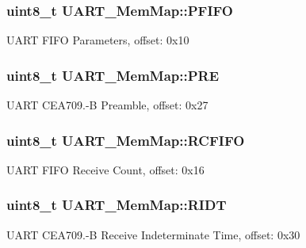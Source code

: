 \subsubsection[{P\+F\+I\+F\+O}]{\setlength{\rightskip}{0pt plus 5cm}uint8\+\_\+t U\+A\+R\+T\+\_\+\+Mem\+Map\+::\+P\+F\+I\+F\+O}\label{struct_u_a_r_t___mem_map_a6ad16328066eeb949b4ee3d4a67776be}
U\+A\+R\+T F\+I\+F\+O Parameters, offset\+: 0x10 \hypertarget{struct_u_a_r_t___mem_map_ae81ff2b0a74594984022da3767a66b20}{}
\subsubsection[{P\+R\+E}]{\setlength{\rightskip}{0pt plus 5cm}uint8\+\_\+t U\+A\+R\+T\+\_\+\+Mem\+Map\+::\+P\+R\+E}\label{struct_u_a_r_t___mem_map_ae81ff2b0a74594984022da3767a66b20}
U\+A\+R\+T C\+E\+A709.-\/\+B Preamble, offset\+: 0x27 \hypertarget{struct_u_a_r_t___mem_map_a3aab8170680196924f67d6810013bb88}{}
\subsubsection[{R\+C\+F\+I\+F\+O}]{\setlength{\rightskip}{0pt plus 5cm}uint8\+\_\+t U\+A\+R\+T\+\_\+\+Mem\+Map\+::\+R\+C\+F\+I\+F\+O}\label{struct_u_a_r_t___mem_map_a3aab8170680196924f67d6810013bb88}
U\+A\+R\+T F\+I\+F\+O Receive Count, offset\+: 0x16 \hypertarget{struct_u_a_r_t___mem_map_a741dca013188d8a9bd49fed8277b4cbd}{}
\subsubsection[{R\+I\+D\+T}]{\setlength{\rightskip}{0pt plus 5cm}uint8\+\_\+t U\+A\+R\+T\+\_\+\+Mem\+Map\+::\+R\+I\+D\+T}\label{struct_u_a_r_t___mem_map_a741dca013188d8a9bd49fed8277b4cbd}
U\+A\+R\+T C\+E\+A709.-\/\+B Receive Indeterminate Time, offset\+: 0x30 \hypertarget{struct_u_a_r_t___mem_map_ad9124bf6041c389a9e13aee5953aa6f6}{}
